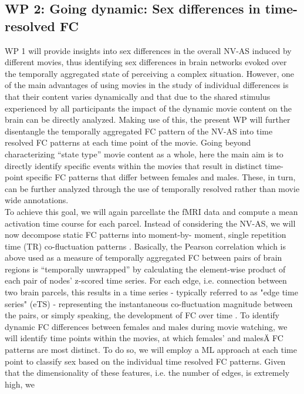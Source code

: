 \documentclass[11pt,a4paper]{article}
\begin{document}
\subsection*{WP 2: Going dynamic: Sex differences in time-resolved FC}
WP 1 will provide insights into sex differences in the overall NV-AS induced by different movies, thus
identifying sex differences in brain networks evoked over the temporally aggregated state of perceiving a
complex situation. However, one of the main advantages of using movies in the study of individual
differences is that their content varies dynamically and that due to the shared stimulus experienced by all
participants the impact of the dynamic movie content on the brain can be directly analyzed. Making use
of this, the present WP will further disentangle the temporally aggregated FC pattern of the NV-AS into
time resolved FC patterns at each time point of the movie. Going beyond characterizing “state type” movie
content as a whole, here the main aim is to directly identify specific events within the movies that result in
distinct time-point specific FC patterns that differ between females and males. These, in turn, can be further
analyzed through the use of temporally resolved rather than movie wide annotations.\\
To achieve this goal, we will again parcellate the fMRI data and compute a mean activation time course for
each parcel. Instead of considering the NV-AS, we will now decompose static FC patterns into moment-by-
moment, single repetition time (TR) co-fluctuation patterns \parencite{betzelLivingEdgeNetwork2023a,faskowitzEdgecentricFunctionalNetwork2020a}.
Basically, the Pearson correlation which is above used as a measure of temporally aggregated FC between
pairs of brain regions is “temporally unwrapped” by calculating the element-wise product of each pair of
nodes' z-scored time series. For each edge, i.e. connection between two brain parcels, this results in a time
series - typically referred to as "edge time series" (eTS) - representing the instantaneous co-fluctuation
magnitude between the pairs, or simply speaking, the development of FC over time \parencite{betzelLivingEdgeNetwork2023a}.
To identify dynamic FC differences between females and males during movie watching, we will identify
time points within the movies, at which females' and malesÄ FC patterns are most distinct. To do so, we
will employ a ML approach at each time point to classify sex based on the individual time resolved FC
patterns. Given that the dimensionality of these features, i.e. the number of edges, is extremely high, we
\end{document}
